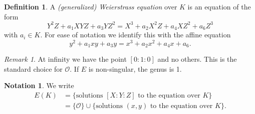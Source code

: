 \documentclass[a4paper]{article}
\theoremstyle{plain}
\theoremstyle{remark}
\newtheorem*{remark}{Remark}
\theoremstyle{definition}
\newtheorem*{definition}{Definition}
\newtheorem*{notation}{Notation}
\renewcommand{\O}{\mathcal{O}}
\begin{document}
\begin{definition}
    A \emph{(generalized) Weierstrass equation} over $K$ is an equation of the
    form
    \begin{equation*}
        Y^2Z + a_1XYZ + a_3YZ^2 = X^3 + a_2X^2Z + a_4XZ^2 + a_6Z^3
    \end{equation*}
    with $a_i\in K$. For ease of notation we identify this with the affine
    equation
    \begin{equation*}
        y^2 + a_1xy + a_3y = x^3 + a_2x^2 + a_4x + a_6.
    \end{equation*}
\end{definition}

\begin{remark}
    At infinity we have the point $[0:1:0]$ and no others. This is the standard
    choice for $\O$. If $E$ is non-singular, the genus is 1.
\end{remark}

\begin{notation}
    We write
    \begin{align*}
        E(K)
            &= \{\text{solutions $[X:Y:Z]$ to the equation over $K$}\} \\
            &= \{\O\}\cup\{\text{solutions $(x,y)$ to the equation over $K$}\}.
    \end{align*}
\end{notation}
\end{document}
